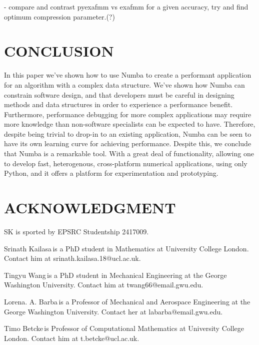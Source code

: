 \documentclass{IEEEcsmag}
\begin{document}
- compare and contrast pyexafmm vs exafmm for a given accuracy, try and find optimum compression parameter.(?)

\section{CONCLUSION}

In this paper we've shown how to use Numba to create a performant application for an algorithm with a complex data structure. We've shown how Numba can constrain software design, and that developers must be careful in designing methods and data structures in order to experience a performance benefit. Furthermore, performance debugging for more complex applications may require more knowledge than non-software specialists can be expected to have. Therefore, despite being trivial to drop-in to an existing application, Numba can be seen to have its own learning curve for achieving performance. Despite this, we conclude that Numba is a remarkable tool. With a great deal of functionality, allowing one to develop fast, heterogenous, cross-platform numerical applications, using only Python, and it offers a platform for experimentation and prototyping.

\section{ACKNOWLEDGMENT}

SK is sported by EPSRC Studentship 2417009.





\begin{IEEEbiography}{Srinath Kailasa}{\,}is a PhD student in Mathematics at University College London. Contact him at srinath.kailasa.18@ucl.ac.uk.
\end{IEEEbiography}

\begin{IEEEbiography}{Tingyu Wang}{\,}is a PhD student in Mechanical Engineering at the George Washington University. Contact him at twang66@email.gwu.edu.
\end{IEEEbiography}

\begin{IEEEbiography}{Lorena. A. Barba}{\,}is a Professor of Mechanical and Aerospace Engineering at the George Washington University.  Contact her at labarba@email.gwu.edu.
\end{IEEEbiography}

\begin{IEEEbiography}{Timo Betcke}{\,}is Professor of Computational Mathematics at University College London. Contact him at t.betcke@ucl.ac.uk.
\end{IEEEbiography}
\end{document}
